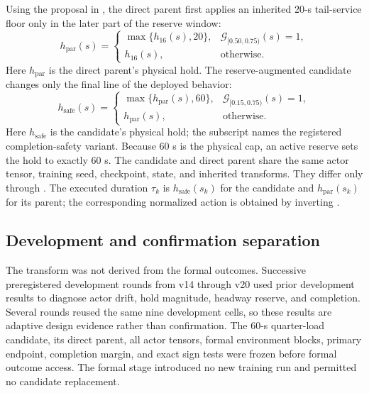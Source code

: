 Using the proposal in , the direct parent first applies an inherited 20-s tail-service floor only in
the later part of the reserve window:
\begin{equation}
h_{\mathrm{par}}(s)=
\begin{cases}
\max\{h_{16}(s),20\}, & \mathcal{G}_{[0.50,0.75)}(s)=1,\\
h_{16}(s), & \text{otherwise}.
\end{cases}
\label{eq:direct_parent}
\end{equation}
Here $h_{\mathrm{par}}$ is the direct parent's physical hold. The
reserve-augmented candidate changes only the final line of the deployed
behavior:
\begin{equation}
h_{\mathrm{safe}}(s)=
\begin{cases}
\max\{h_{\mathrm{par}}(s),60\}, &
\mathcal{G}_{[0.15,0.75)}(s)=1,\\
h_{\mathrm{par}}(s), & \text{otherwise}.
\end{cases}
\label{eq:completion_reserve}
\end{equation}
Here $h_{\mathrm{safe}}$ is the candidate's physical hold; the subscript names
the registered completion-safety variant. Because 60 s is the physical cap, an active reserve sets the hold to exactly
60 s. The candidate and direct parent share the same actor tensor, training
seed, checkpoint, state, and inherited transforms. They differ only through
. The executed duration $\tau_k$ is
$h_{\mathrm{safe}}(s_k)$ for the candidate and $h_{\mathrm{par}}(s_k)$ for
its parent; the corresponding normalized action is obtained by inverting
.

\subsection{Development and confirmation separation}
\label{sec:method:separation}

The transform was not derived from the formal outcomes. Successive
preregistered development rounds from v14 through v20 used prior development
results to diagnose actor drift, hold magnitude, headway reserve, and
completion. Several rounds reused the same nine development cells, so these
results are adaptive design evidence rather than confirmation. The 60-s
quarter-load candidate, its direct parent, all actor tensors, formal
environment blocks, primary endpoint, completion margin, and exact sign tests
were frozen before formal outcome access. The formal stage introduced no new
training run and permitted no candidate replacement.
